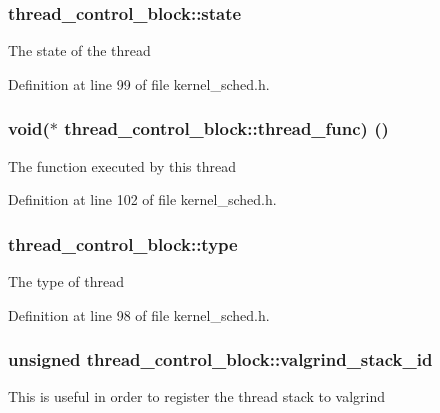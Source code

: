 \subsubsection[{\texorpdfstring{state}{state}}]{ thread\+\_\+control\+\_\+block\+::state}\hypertarget{structthread__control__block_affd872365cf4768fa1c9bd1e196bb97c}{}\label{structthread__control__block_affd872365cf4768fa1c9bd1e196bb97c}
The state of the thread 

Definition at line 99 of file kernel\+\_\+sched.\+h.

\subsubsection[{\texorpdfstring{thread\+\_\+func}{thread_func}}]{\setlength{\rightskip}{0pt plus 5cm}void($\ast$ thread\+\_\+control\+\_\+block\+::thread\+\_\+func) ()}\hypertarget{structthread__control__block_a91a73f2ad3f727b7412b912b3d65109a}{}\label{structthread__control__block_a91a73f2ad3f727b7412b912b3d65109a}
The function executed by this thread 

Definition at line 102 of file kernel\+\_\+sched.\+h.

\subsubsection[{\texorpdfstring{type}{type}}]{ thread\+\_\+control\+\_\+block\+::type}\hypertarget{structthread__control__block_abd0f40bdcb22c701df03f560bbc42d5c}{}\label{structthread__control__block_abd0f40bdcb22c701df03f560bbc42d5c}
The type of thread 

Definition at line 98 of file kernel\+\_\+sched.\+h.

\subsubsection[{\texorpdfstring{valgrind\+\_\+stack\+\_\+id}{valgrind_stack_id}}]{\setlength{\rightskip}{0pt plus 5cm}unsigned thread\+\_\+control\+\_\+block\+::valgrind\+\_\+stack\+\_\+id}\hypertarget{structthread__control__block_ad8a2da36c0ad775c12c5f66f4fec9d41}{}\label{structthread__control__block_ad8a2da36c0ad775c12c5f66f4fec9d41}
This is useful in order to register the thread stack to valgrind 

